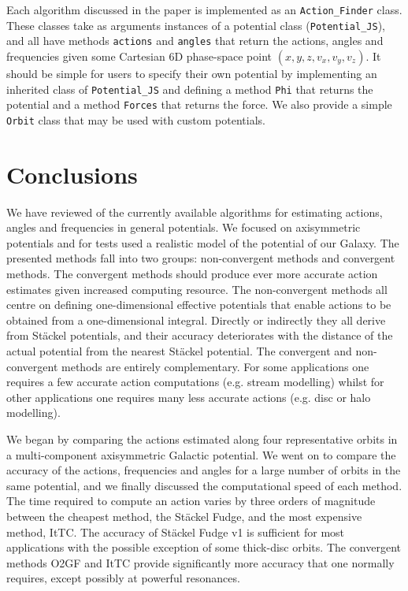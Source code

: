 \documentclass[useAMS,usenatbib,fleqn,a4paper]{mn2e}
\begin{document}
Each algorithm discussed in the paper is implemented as an
\texttt{Action\_Finder} class. These classes take as arguments instances of a
potential class (\texttt{Potential\_JS}), and all have methods
\texttt{actions} and \texttt{angles} that return the actions, angles and
frequencies given some Cartesian 6D phase-space point $(x,y,z,v_x,v_y,v_z)$.
It should be simple for users to specify their own potential by implementing
an inherited class of \texttt{Potential\_JS} and defining a method
\texttt{Phi} that returns the potential and a method \texttt{Forces} that
returns the force. We also provide a simple \texttt{Orbit} class that may be
used with custom potentials.

\section{Conclusions}\label{Sect::Conclusions}

We have reviewed of the currently available algorithms for
estimating actions, angles and frequencies in general potentials. We focused
on axisymmetric potentials and for tests used a realistic model of the
potential of our Galaxy. The presented methods fall into two groups: non-convergent
methods and convergent methods.
The convergent methods should produce ever more accurate action estimates
given increased computing resource. 
The non-convergent methods all centre on
defining one-dimensional effective potentials that enable actions to be
obtained from a one-dimensional integral. Directly or indirectly they all
derive from St\"ackel potentials, and their accuracy deteriorates with the
distance of the actual potential from the nearest St\"ackel potential.  The
convergent and non-convergent methods are entirely complementary. For some
applications one requires a few accurate action computations (e.g. stream
modelling) whilst for other applications one requires many less accurate
actions (e.g. disc or halo modelling).

We began by comparing the actions estimated along four representative orbits
in a multi-component axisymmetric Galactic potential. We went on to compare
the accuracy of the actions, frequencies and angles for a large number of
orbits in the same potential, and we finally discussed the computational
speed of each method. The time required to compute an action varies by three
orders of magnitude between the cheapest method, the St\"ackel Fudge, and the
most expensive method, ItTC. The accuracy of
St\"ackel Fudge v1 is sufficient for most applications with the possible
exception of some thick-disc orbits. The convergent methods O2GF and
ItTC provide significantly more accuracy that one normally requires,
except possibly at powerful resonances.
\end{document}
